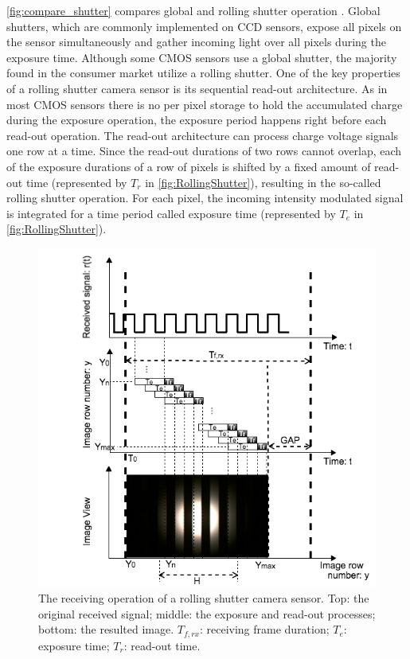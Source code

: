 \autoref{fig:compare_shutter} compares global and rolling shutter operation \cite{imagesensor}. Global shutters, which are commonly implemented on CCD sensors, expose all pixels on the sensor simultaneously and gather incoming light over all pixels during the exposure time. 
Although some CMOS sensors use a global shutter, the majority found in the consumer market utilize a rolling shutter. 
One of the key properties of a rolling shutter camera sensor is its sequential read-out architecture. 
As in most CMOS sensors there is no per pixel storage to hold the accumulated charge during the exposure operation, the exposure period happens right before each read-out operation. 
The read-out architecture can process charge voltage signals one row at a time. 
Since the read-out durations of two rows cannot overlap, each of the exposure durations of a row of pixels is shifted by a fixed amount of read-out time (represented by $T_r$ in \autoref{fig:RollingShutter}), resulting in the so-called rolling shutter operation.
For each pixel, the incoming intensity modulated signal is integrated for a time period called exposure time (represented by $T_e$ in \autoref{fig:RollingShutter}). 

\begin{figure}[!t]
  \centering
  \includegraphics[scale=0.45]{pic/rollingshutter.png}
  \caption{The receiving operation of a rolling shutter camera sensor. Top: the original received signal; middle: the exposure and read-out processes; bottom: the resulted image. $T_{f,rx}$: receiving frame duration; $T_e$: exposure time; $T_r$: read-out time.}
  \label{fig:RollingShutter}
\end{figure}

